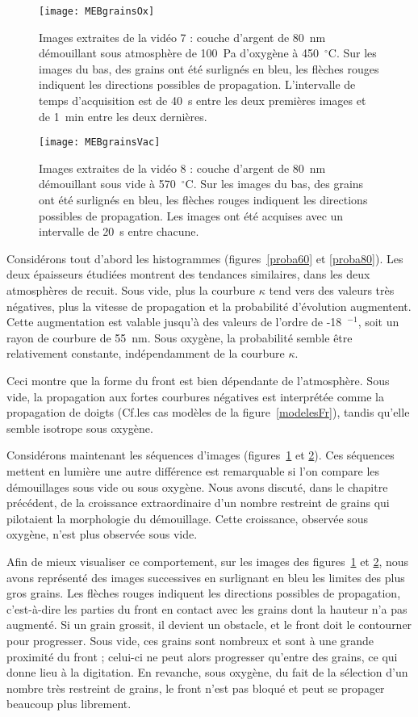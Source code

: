 \begin{figure}[!p]
\centering
\texttt{[image: MEBgrainsOx]}
\caption{Images extraites de la vidéo 7 : couche d'argent de 80~nm démouillant sous atmosphère de 100~Pa d'oxygène à 450~$^\circ$C. Sur les images du bas, des grains ont été surlignés en bleu, les flèches rouges indiquent les directions possibles de propagation. L'intervalle de temps d'acquisition est de 40~s entre les deux premières images et de 1~min entre les deux dernières.}
\label{MEBgrainsOx}
\end{figure}

\begin{figure}[!p]
\centering
\texttt{[image: MEBgrainsVac]}
\caption{Images extraites de la vidéo 8 : couche d'argent de 80~nm démouillant sous vide à 570~$^\circ$C. Sur les images du bas, des grains ont été surlignés en bleu, les flèches rouges indiquent les directions possibles de propagation. Les images ont été acquises avec un intervalle de 20~s entre chacune.}
\label{MEBgrainsVac}
\end{figure}
Considérons tout d'abord les histogrammes (figures~\ref{proba60} et \ref{proba80}). Les deux épaisseurs étudiées montrent des tendances similaires, dans les deux atmosphères de recuit. Sous vide, plus la courbure $\kappa$ tend vers des valeurs très négatives, plus la vitesse de propagation et la probabilité d'évolution augmentent. Cette augmentation est valable jusqu'à des valeurs de l'ordre de -18~\micro\meter$^{-1}$, soit un rayon de courbure de 55~nm. Sous oxygène, la probabilité semble être relativement constante, indépendamment de la courbure $\kappa$.\par 
Ceci montre que la forme du front est bien dépendante de l'atmosphère. Sous vide, la propagation aux fortes courbures négatives est interprétée comme la propagation de doigts (Cf.les cas modèles de la figure~\ref{modelesFr}), tandis qu'elle semble isotrope sous oxygène.\par 
Considérons maintenant les séquences d'images (figures~\ref{MEBgrainsOx} et \ref{MEBgrainsVac}). Ces séquences mettent en lumière une autre différence est remarquable si l'on compare les démouillages sous vide ou sous oxygène. Nous avons discuté, dans le chapitre précédent, de la croissance extraordinaire d'un nombre restreint de grains qui pilotaient la morphologie du démouillage. Cette croissance, observée sous oxygène, n'est plus observée sous vide.\par
Afin de mieux visualiser ce comportement, sur les images des figures~\ref{MEBgrainsOx} et \ref{MEBgrainsVac}, nous avons représenté des images successives en surlignant en bleu les limites des plus gros grains. Les flèches rouges indiquent les directions possibles de propagation, c'est-à-dire les parties du front en contact avec les grains dont la hauteur n'a pas augmenté. Si un grain grossit, il devient un obstacle, et le front doit le contourner pour progresser. Sous vide, ces grains sont nombreux et sont à une grande proximité du front ; celui-ci ne peut alors progresser qu'entre des grains, ce qui donne lieu à la digitation. En revanche, sous oxygène, du fait de la sélection d'un nombre très restreint de grains, le front n'est pas bloqué et peut se propager beaucoup plus librement.\par 
